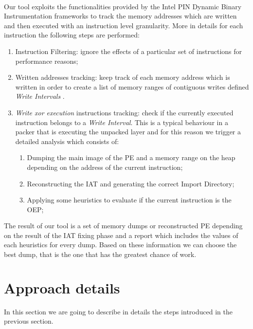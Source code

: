 \paragraph{}
Our tool exploits the functionalities provided by the Intel PIN Dynamic Binary Instrumentation frameworks to track the memory addresses which are written and then executed with an instruction level granularity.
More in details for each instruction the following steps are performed:
\begin{enumerate}
\item Instruction Filtering: ignore the effects of a particular set of instructions for performance reasons;
\item Written addresses tracking: keep track of each memory address which is written in order to create a list of memory ranges of contiguous writes defined \textit{Write Intervals} .
\item \textit{Write xor execution} instructions tracking: check if the currently executed instruction belongs to a \textit{Write Interval}. This is a typical behaviour in a packer that is executing the unpacked layer and for this reason we trigger a detailed analysis which consists of:
	\begin{enumerate}
	\item Dumping the main image of the PE and a memory range on the heap depending on the address of the current instruction;
	\item Reconstructing the IAT and generating the correct Import Directory;
	\item Applying some heuristics to evaluate if the current instruction is the OEP;
	\end{enumerate}
\end{enumerate}
The result of our tool is a set of memory dumps or reconstructed PE depending on the result of the IAT fixing phase and a report which includes the values of each heuristics for every dump. Based on these information we can choose the best dump, that is the one that has the greatest chance of work.\\

\section{Approach details}
\paragraph{}
In this section we are going to describe in details the steps introduced in the previous section.
